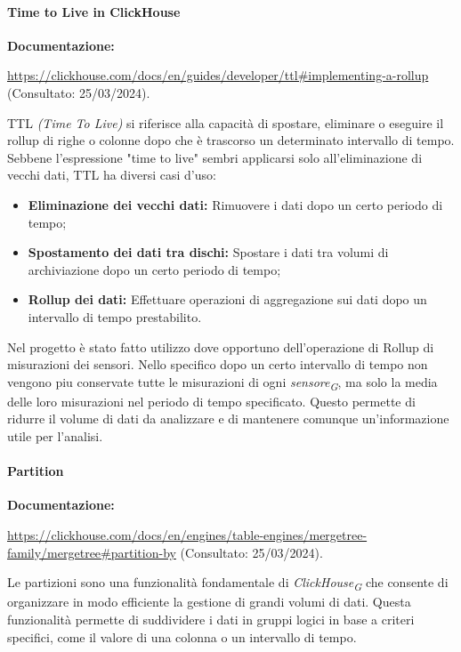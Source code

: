 \paragraph{Time to Live in ClickHouse} \label{sec:RollupTTL}
\textbf{Documentazione:}

\url{https://clickhouse.com/docs/en/guides/developer/ttl#implementing-a-rollup} (Consultato: 25/03/2024).

TTL \textit{(Time To Live)} si riferisce alla capacità di spostare, eliminare o eseguire il rollup di righe o colonne dopo che è trascorso un determinato intervallo di tempo. Sebbene l'espressione "time to live" sembri applicarsi solo all'eliminazione di vecchi dati, TTL ha diversi casi d'uso:

\begin{itemize}
	\item \textbf{Eliminazione dei vecchi dati:} Rimuovere i dati dopo un certo periodo di tempo;
	\item \textbf{Spostamento dei dati tra dischi:} Spostare i dati tra volumi di archiviazione dopo un certo periodo di tempo;
	\item \textbf{Rollup dei dati:} Effettuare operazioni di aggregazione sui dati dopo un intervallo di tempo prestabilito.
\end{itemize}

Nel progetto è stato fatto utilizzo dove opportuno dell'operazione di Rollup di misurazioni dei sensori.
Nello specifico dopo un certo intervallo di tempo non vengono piu conservate tutte le misurazioni di ogni \textit{sensore}\textsubscript{\textit{G}}, ma solo la media delle loro misurazioni nel periodo di tempo specificato. Questo permette di ridurre il volume di dati da analizzare e di mantenere comunque un'informazione utile per l'analisi.

\paragraph{Partition}\label{sec:Partition}
\textbf{Documentazione:}

\url{https://clickhouse.com/docs/en/engines/table-engines/mergetree-family/mergetree#partition-by} (Consultato: 25/03/2024).

Le partizioni sono una funzionalità fondamentale di \textit{ClickHouse}\textsubscript{\textit{G}} che consente di organizzare in modo efficiente la gestione di grandi volumi di dati. Questa funzionalità permette di suddividere i dati in gruppi logici in base a criteri specifici, come il valore di una colonna o un intervallo di tempo.

